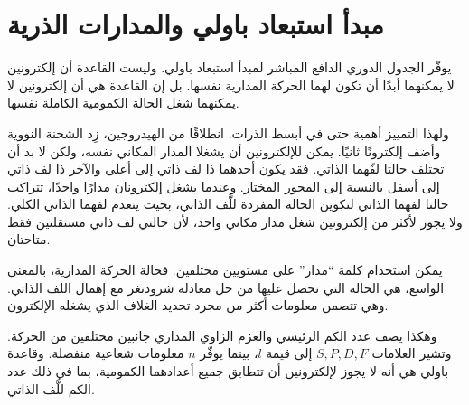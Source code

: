 \section{مبدأ استبعاد باولي والمدارات الذرية}

يوفّر الجدول الدوري الدافع المباشر لمبدأ استبعاد باولي. وليست القاعدة أن إلكترونين لا يمكنهما أبدًا أن تكون لهما الحركة المدارية نفسها. بل إن القاعدة هي أن إلكترونين لا يمكنهما شغل الحالة الكمومية الكاملة نفسها.

ولهذا التمييز أهمية حتى في أبسط الذرات. انطلاقًا من الهيدروجين، زِد الشحنة النووية وأضف إلكترونًا ثانيًا. يمكن للإلكترونين أن يشغلا المدار المكاني نفسه، ولكن لا بد أن تختلف حالتا لفّهما الذاتي. فقد يكون أحدهما ذا لف ذاتي إلى أعلى والآخر ذا لف ذاتي إلى أسفل بالنسبة إلى المحور المختار. وعندما يشغل إلكترونان مدارًا واحدًا، تتراكب حالتا لفهما الذاتي لتكوين الحالة المفردة للَّف الذاتي، بحيث ينعدم لفهما الذاتي الكلي. ولا يجوز لأكثر من إلكترونين شغل مدار مكاني واحد، لأن حالتي لف ذاتي مستقلتين فقط متاحتان.

\begin{classroomqa}
\end{classroomqa}

يمكن استخدام كلمة ``مدار'' على مستويين مختلفين. فحالة الحركة المدارية، بالمعنى الواسع، هي الحالة التي نحصل عليها من حل معادلة شرودنغر مع إهمال اللف الذاتي. وهي تتضمن معلومات أكثر من مجرد تحديد الغلاف الذي يشغله الإلكترون.

\begin{classroomqa}
\end{classroomqa}

وهكذا يصف عدد الكم الرئيسي والعزم الزاوي المداري جانبين مختلفين من الحركة. وتشير العلامات \(S,P,D,F\) إلى قيمة \(l\)، بينما يوفّر \(n\) معلومات شعاعية منفصلة. وقاعدة باولي هي أنه لا يجوز لإلكترونين أن تتطابق جميع أعدادهما الكمومية، بما في ذلك عدد الكم للَّف الذاتي.

